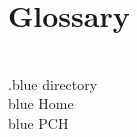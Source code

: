 \section{Glossary}\label{glossary}

\section{}

\begin{description}
\item[.blue directory]
\item[blue Home]
\item[blue PCH]
\end{description}

